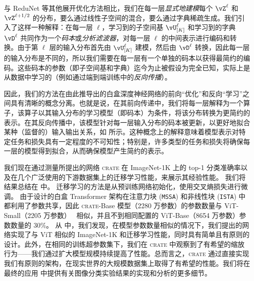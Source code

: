 \documentclass[../../book-main_zh.tex]{subfiles}
\begin{document}
\begin{remark}\label{sub:forward_backward}
    与 ReduNet \cite{chan2021redunet} 等其他展开优化方法相比，我们在每一层\textit{显式地建模}每个 $\vZ^\ell$ 和 $\vZ^{\ell + 1/2}$ 的分布，要么通过线性子空间的混合，要么通过字典稀疏生成。我们引入了这样一种解释：在每一层 \(\ell\)，学习到的子空间基 \(\vU_{[K]}^{\ell}\) 和学习到的字典 \(\vD^{\ell}\) 共同作为一个\textit{码本}或\textit{分析滤波器}，对每一层 \(\ell\) 的中间表示进行编码和转换。由于第 \(\ell\) 层的输入分布首先由 \(\vU_{[K]}^{\ell}\) 建模，然后由 \(\vD^{\ell}\) 转换，因此每一层的输入分布是不同的，所以我们需要在每一层有一个单独的码本以获得最简约的编码。这些码本的参数（即子空间基和字典）迄今为止被假设为完全已知，实际上是从数据中学习的（例如通过端到端训练中的\textit{反向传播}）。

    因此，我们的方法在由此推导出的白盒深度神经网络的前向“优化”和反向“学习”之间具有清晰的概念分离。也就是说，在其前向传递中，我们将每一层解释为一个算子，该算子以其输入分布的学习模型（即码本）为条件，将该分布转换为更简约的表示。在其反向传播中，该模型针对每一层输入分布的码本被更新，以更好地拟合某种（监督的）输入输出关系，如  所示。这种概念上的解释意味着模型表示对特定任务和损失具有一定程度的不可知性；特别是，许多类型的任务和损失将确保每一层的模型得到拟合，从而确保模型产生简约的表示。
\end{remark}

我们现在通过测量所提出的网络 \textsc{crate} 在 ImageNet-1K 上的 top-1 分类准确率以及在几个广泛使用的下游数据集上的迁移学习性能，来展示其经验性能。
我们将结果总结在  中。
迁移学习的方法是从预训练网络初始化，使用交叉熵损失进行微调。
由于设计的白盒 Transformer 架构在注意力块 (\texttt{MSSA}) 和非线性块 (\texttt{ISTA}) 中都利用了参数共享，因此 \textsc{crate}{-Base} 模型（2280 万参数）的参数数量与 ViT-Small（2205 万参数）~\cite{dosovitskiy2020image} 相似，并且不到相同配置的 ViT-Base（8654 万参数）参数数量的 30\%。
从  中，我们发现，在模型参数数量相似的情况下，我们提出的网络实现了与 ViT 相似的 ImageNet-1K 和迁移学习性能，同时具有简单且有原则的设计。此外，在相同的训练超参数集下，我们在 \textsc{crate} 中观察到了有希望的缩放行为——我们通过扩大模型规模持续提高了性能。总而言之，\textsc{crate} 通过直接实现我们有原则的架构，在现实世界的大规模数据集上取得了有希望的性能。我们将在最终的应用  中提供有关图像分类实验结果的实现和分析的更多细节。
\end{document}
